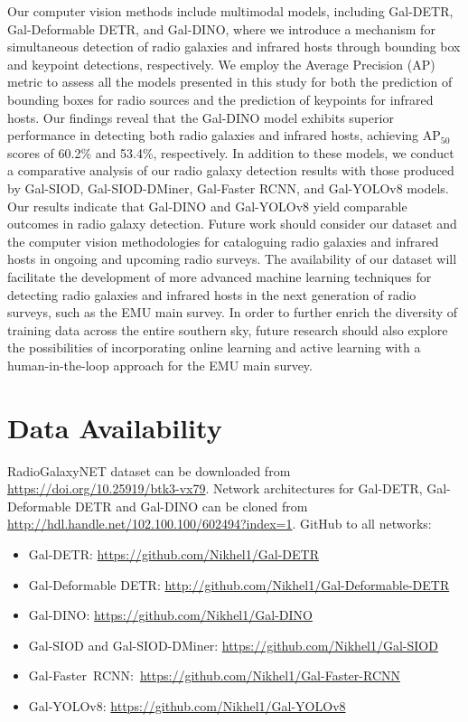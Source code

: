 \documentclass[
  journal=pasa,
  manuscript=research-paper, %
  year=2020,
  volume=37,
]{cup-journal}
\begin{document}
Our computer vision methods include multimodal models, including Gal-DETR, Gal-Deformable DETR, and Gal-DINO, where we introduce a mechanism for simultaneous detection of radio galaxies and infrared hosts through bounding box and keypoint detections, respectively.
We employ the Average Precision (AP) metric to assess all the models presented in this study for both the prediction of bounding boxes for radio sources and the prediction of keypoints for infrared hosts.
Our findings reveal that the Gal-DINO model exhibits superior performance in detecting both radio galaxies and infrared hosts, achieving AP$_{50}$ scores of 60.2\% and 53.4\%, respectively. 
In addition to these models, we conduct a comparative analysis of our radio galaxy detection results with those produced by Gal-SIOD, Gal-SIOD-DMiner, Gal-Faster RCNN, and Gal-YOLOv8 models. Our results indicate that Gal-DINO and Gal-YOLOv8 yield comparable outcomes in radio galaxy detection.  Future work should consider our dataset and the computer vision methodologies for cataloguing radio galaxies and infrared hosts in ongoing and upcoming radio surveys.
The availability of our dataset will facilitate the development of more advanced machine learning techniques for detecting radio galaxies and infrared hosts in the next generation of radio surveys, such as the EMU main survey.
In order to further enrich the diversity of training data across the entire southern sky, future research should also explore the possibilities of incorporating online learning and active learning with a human-in-the-loop approach for the EMU main survey.

\section*{Data Availability}

RadioGalaxyNET dataset can be downloaded from \url{https://doi.org/10.25919/btk3-vx79}.
Network architectures for Gal-DETR, Gal-Deformable DETR and Gal-DINO can be cloned from \url{http://hdl.handle.net/102.100.100/602494?index=1}.
GitHub to all networks:
\begin{itemize}
    \item Gal-DETR: \url{https://github.com/Nikhel1/Gal-DETR}
    \item Gal-Deformable DETR: \url{http://github.com/Nikhel1/Gal-Deformable-DETR}
    \item Gal-DINO: \url{https://github.com/Nikhel1/Gal-DINO}
    \item Gal-SIOD and Gal-SIOD-DMiner: \url{https://github.com/Nikhel1/Gal-SIOD}
    \item Gal-Faster~RCNN:~\url{https://github.com/Nikhel1/Gal-Faster-RCNN}
    \item Gal-YOLOv8: \url{https://github.com/Nikhel1/Gal-YOLOv8}
\end{itemize}
\end{document}
